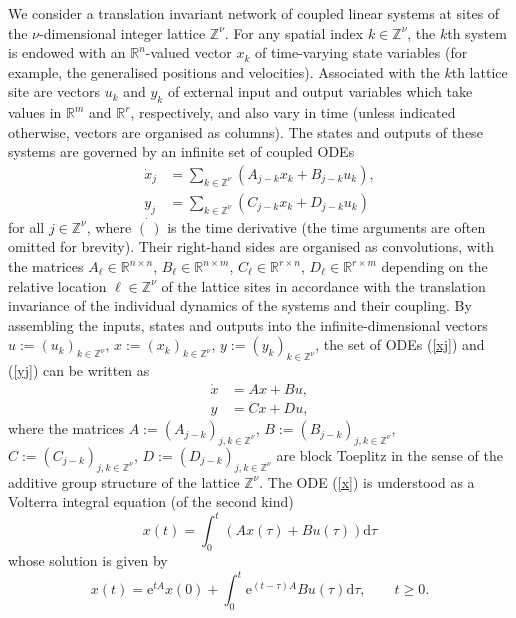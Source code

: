 \documentclass[letterpaper, 10pt, conference]{ieeeconf}  %
\def\>{\geqslant}           %
\def\mZ{\mathbb{Z}}    %
\def\mR{\mathbb{R}}    %
\def\re{\mathrm{e}}        %
\def\rd{\mathrm{d}}        %
\def\x{\times}
\def\mZ{\mathbb{Z}}
\begin{document}
We consider a translation invariant network of coupled linear systems at sites of the $\nu$-dimensional integer lattice $\mZ^{\nu}$. For any spatial index $k \in \mZ^{\nu}$, the $k$th system is endowed with an $\mR^n$-valued  vector $x_k$ of time-varying state variables (for example, the generalised positions and velocities). Associated with the $k$th lattice site are vectors $u_k$ and $y_k$  of external input and output variables which take values in $\mR^m$ and $\mR^r$, respectively, and also vary in time (unless indicated otherwise, vectors are organised as columns).
The states and outputs of these systems are governed by an infinite  set of coupled ODEs
\begin{align}
\label{xj}
  \dot{x}_j
  & =
  \sum_{k \in \mZ^\nu}
  (A_{j-k} x_k + B_{j-k} u_k),\\
\label{yj}
  y_j
  & =
  \sum_{k\in \mZ^\nu}
  (C_{j-k} x_k + D_{j-k} u_k)
\end{align}
for all $j\in \mZ^\nu$, where
$\dot{(\,)}$ is the time derivative (the time arguments are often omitted for brevity). Their right-hand sides are organised as convolutions, with the matrices $A_\ell \in \mR^{n\x n}$, $B_\ell\in \mR^{n\x m}$, $C_\ell\in \mR^{r\x n}$, $D_\ell \in \mR^{r\x m}$ depending on the relative location $\ell \in \mZ^\nu$ of the lattice sites in accordance with the translation invariance of the individual dynamics  of the systems and their coupling.
By assembling the inputs, states and outputs into the infinite-dimensional vectors $u:= (u_k)_{k \in \mZ^\nu}$, $x:= (x_k)_{k \in \mZ^\nu}$, $y:= (y_k)_{k \in \mZ^\nu}$, the set of ODEs (\ref{xj}) and (\ref{yj}) can be written as
\begin{align}
\label{x}
  \dot{x}
  & =
  A x + B u,\\
\label{y}
  y
  & =
  Cx+Du,
\end{align}
where the matrices $A:= (A_{j-k})_{j,k \in \mZ^\nu}$, $B:= (B_{j-k})_{j,k \in \mZ^\nu}$, $C:= (C_{j-k})_{j,k \in \mZ^\nu}$,  $D:= (D_{j-k})_{j,k \in \mZ^\nu}$ are block Toeplitz in the sense of the additive group structure of the lattice $\mZ^\nu$. The ODE (\ref{x}) is understood as a Volterra integral equation (of the second kind)
\begin{equation}
\label{xint}
    x(t)
    =
    \int_0^t
    (A x(\tau) + B u(\tau))
    \rd \tau
\end{equation}
whose solution is given by
\begin{equation}
\label{xsol}
    x(t)
    =
    \re^{tA} x(0) + \int_0^t \re^{(t-\tau) A} B u(\tau)\rd \tau,
    \qquad
    t\>0.
\end{equation}
\end{document}

